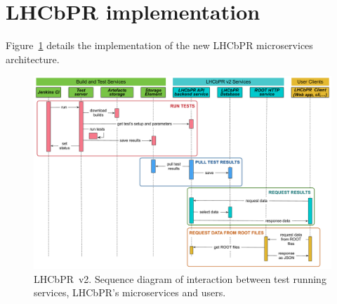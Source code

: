 \documentclass[a4paper]{jpconf}
\begin{document}
\section{LHCbPR implementation}\label{sec:impl}

Figure~\ref{figLHCbPR2}  details the implementation of the new LHCbPR microservices
architecture. 

\begin{figure}[H]
\begin{minipage}{\textwidth}
\includegraphics[width=\textwidth]{figs/LHCbPR2.pdf}
\caption{\label{figLHCbPR2} LHCbPR~v2. Sequence diagram of interaction between test
running services, LHCbPR's microservices and users.}
\end{minipage}
\end{figure}
\end{document}
